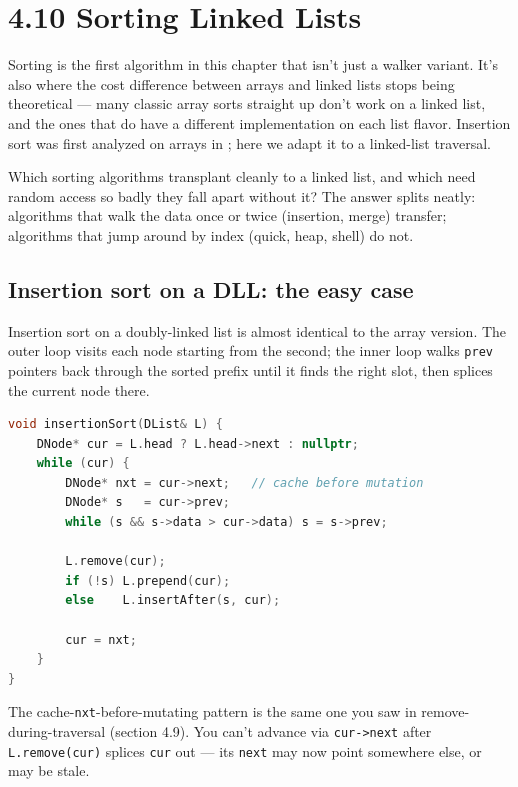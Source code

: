 \documentclass[11pt]{article}
\begin{document}
\section{4.10 Sorting Linked Lists}

Sorting is the first algorithm in this chapter that isn't just a
walker variant. It's also where the cost difference between arrays
and linked lists stops being theoretical --- many classic array
sorts straight up don't work on a linked list, and the ones that
do have a different implementation on each list flavor. Insertion
sort was first analyzed on arrays in ; here we
adapt it to a linked-list traversal.

\begin{ideabox}
Which sorting algorithms transplant cleanly to a linked list, and
which need random access so badly they fall apart without it? The
answer splits neatly: algorithms that walk the data once or twice
(insertion, merge) transfer; algorithms that jump around by index
(quick, heap, shell) do not.
\end{ideabox}

\subsection*{Insertion sort on a DLL: the easy case}

Insertion sort on a doubly-linked list is almost identical to the
array version. The outer loop visits each node starting from the
second; the inner loop walks \texttt{prev} pointers back through
the sorted prefix until it finds the right slot, then splices the
current node there.

\begin{examplebox}
\begin{lstlisting}[language=C++,basicstyle=\ttfamily\small,frame=single]
void insertionSort(DList& L) {
    DNode* cur = L.head ? L.head->next : nullptr;
    while (cur) {
        DNode* nxt = cur->next;   // cache before mutation
        DNode* s   = cur->prev;
        while (s && s->data > cur->data) s = s->prev;

        L.remove(cur);
        if (!s) L.prepend(cur);
        else    L.insertAfter(s, cur);

        cur = nxt;
    }
}
\end{lstlisting}
\end{examplebox}

The cache-\texttt{nxt}-before-mutating pattern is the same one you
saw in remove-during-traversal (section 4.9). You can't advance
via \texttt{cur->next} after \texttt{L.remove(cur)} splices
\texttt{cur} out --- its \texttt{next} may now point somewhere
else, or may be stale.
\end{document}
